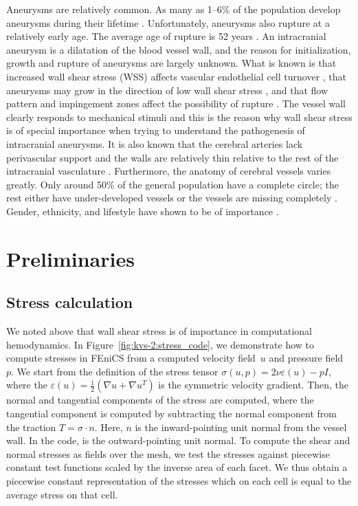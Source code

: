 Aneurysms are relatively common. As many as 1--6\% of the population
develop aneurysms during their
lifetime \citep{Weir2002}. Unfortunately, aneurysms also rupture at a
relatively early age. The average age of rupture is 52
years \citep{Humphrey2001}. An intracranial aneurysm is a dilatation of
the blood vessel wall, and the reason for initialization, growth and
rupture of aneurysms are largely unknown.  What is known is that
increased wall shear stress (WSS) affects vascular endothelial cell
turnover \citep{DAVIESREMUZZIGORDONEtAl1986}, that aneurysms may grow
in the direction of low wall shear
stress \citep{BousselRayzMcCullochEtAl2008}, and that flow pattern and
impingement zones affect the possibility of
rupture \citep{CebralCastroBurgessEtAl2005}. The vessel wall clearly
responds to mechanical stimuli and this is the reason why wall shear
stress is of special importance when trying to understand the
pathogenesis of intracranial aneurysms. It is also known that the
cerebral arteries lack perivascular support and the walls are
relatively thin relative to the rest of the intracranial
vasculature \citep{Humphrey2001,Stehbens1975}.  Furthermore, the
anatomy of cerebral vessels varies greatly. Only around 50\% of the
general population have a complete circle; the rest either have
under-developed vessels or the vessels are missing
completely \citep{Fung1984}. Gender, ethnicity, and lifestyle have
shown to be of
importance \citep{MhurchuAndersonJamrozikEtAl2001,LongstrethNelsonKoepsellEtAl1994,KongableLanzinoGermansonEtAl1996}.

\section{Preliminaries}

\subsection{Stress calculation}

We noted above that wall shear stress is of importance in
computational hemodynamics. In Figure~\ref{fig:kvs-2:stress_code}, we
demonstrate how to compute stresses in FEniCS from a computed velocity
field~$u$ and pressure field~$p$. We start from the definition of the
stress tensor $\sigma(u,p) = 2 \nu \varepsilon (u) - p I$, where the
$\varepsilon(u) = \frac{1}{2}(\nabla u + \nabla u^T)$ is the symmetric
velocity gradient. Then, the normal and tangential components of the
stress are computed, where the tangential component is computed by
subtracting the normal component from the traction $T = \sigma \cdot
n$. Here, $n$ is the inward-pointing unit normal from the vessel
wall. In the code,  is the outward-pointing unit normal. To
compute the shear and normal stresses as fields over the mesh, we test
the stresses against piecewise constant test functions scaled by the
inverse area of each facet. We thus obtain a piecewise constant
representation of the stresses which on each cell is equal to the
average stress on that cell.

